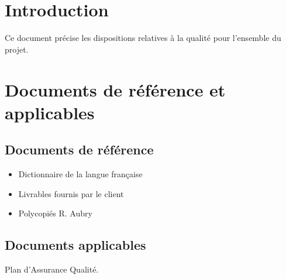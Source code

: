 \documentclass[twoside]{article}
\begin{document}



\section{Introduction}
Ce document précise les dispositions relatives à la qualité pour l'ensemble du projet.



\section{Documents de référence et applicables}
    
    \subsection{Documents de référence}
\begin{itemize}
   \item Dictionnaire de la langue française
   \item Livrables fournis par le client
   \item Polycopiés R. Aubry
\end{itemize}

    \subsection{Documents applicables}
        Plan d'Assurance Qualité.



\end{document}
